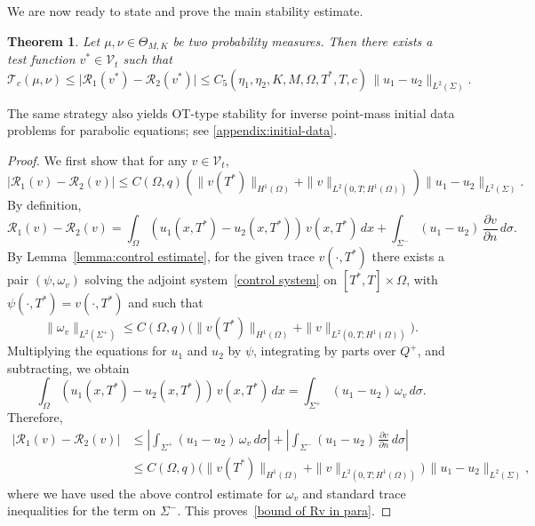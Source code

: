 \documentclass[12pt]{amsart}
\newtheorem{thm}{Theorem}
\begin{document}
We are now ready to state and prove the main stability estimate.
\begin{thm}
Let \(\mu,\nu \in \Theta_{M,K}\) be two probability measures. Then there exists a test function \(v^*\in\mathcal{V}_t\) such that
\begin{equation}\label{final para result}
    \mathcal{T}_c(\mu, \nu)
    \leq \big|\mathcal{R}_1(v^*)-\mathcal{R}_2(v^*)\big|
    \leq C_5(\eta_1,\eta_2,K,M,\Omega,T^*,T,c)\,
        \|u_1-u_2\|_{L^2(\Sigma)}.
\end{equation}
\end{thm}

The same strategy also yields OT-type stability for inverse point-mass 
initial data problems for parabolic equations; see \ref{appendix:initial-data}.

\begin{proof}
    We first show that for any \(v\in\mathcal{V}_t\),
    \begin{equation}\label{bound of Rv in para}
        |\mathcal{R}_1(v) - \mathcal{R}_2(v)| \leq C(\Omega, q)\left( \|v(T^*)\|_{H^1(\Omega)} + \|v\|_{L^2(0,T; H^1(\Omega))} \right)\|u_1 - u_2\|_{L^2(\Sigma)}.
    \end{equation}
    By definition,
    \begin{equation*}
        \mathcal{R}_1(v) - \mathcal{R}_2(v) 
        = \int_\Omega (u_1(x, T^*) - u_2(x, T^*))\,v(x, T^*)\,dx 
        + \int_{\Sigma^-} (u_1 - u_2)\,\frac{\partial v}{\partial n}\,d\sigma.
    \end{equation*}
    By Lemma~\ref{lemma:control estimate}, for the given trace \(v(\cdot,T^*)\) there exists a pair \((\psi,\omega_v)\) solving the adjoint system~\eqref{control system} on \([T^*,T]\times\Omega\), with \(\psi(\cdot,T^*) = v(\cdot,T^*)\) and such that
    \[
    \|\omega_v\|_{L^2(\Sigma^+)}
    \le C(\Omega,q)\Big(\|v(T^*)\|_{H^1(\Omega)} + \|v\|_{L^2(0,T;H^1(\Omega))}\Big).
    \]
    Multiplying the equations for \(u_1\) and \(u_2\) by \(\psi\), integrating by parts over \(Q^+\), and subtracting, we obtain
    \begin{equation*}
        \int_\Omega (u_1(x, T^*) - u_2(x, T^*))\,v(x, T^*)\,dx
        = \int_{\Sigma^+} (u_1 - u_2)\,\omega_v\,d\sigma.
    \end{equation*}
    Therefore,
    \begin{align*}
        \big|\mathcal{R}_1(v) - \mathcal{R}_2(v)\big|
        &\le \left|\int_{\Sigma^+} (u_1 - u_2)\,\omega_v\,d\sigma\right|
            + \left|\int_{\Sigma^-} (u_1 - u_2)\,\frac{\partial v}{\partial n}\,d\sigma\right| \\
        &\le C(\Omega,q)\Big(\|v(T^*)\|_{H^1(\Omega)} 
                            + \|v\|_{L^2(0,T;H^1(\Omega))}\Big)\,
            \|u_1 - u_2\|_{L^2(\Sigma)},
    \end{align*}
    where we have used the above control estimate for \(\omega_v\) and standard trace inequalities for the term on \(\Sigma^-\). This proves~\eqref{bound of Rv in para}.


\end{proof}
\end{document}

